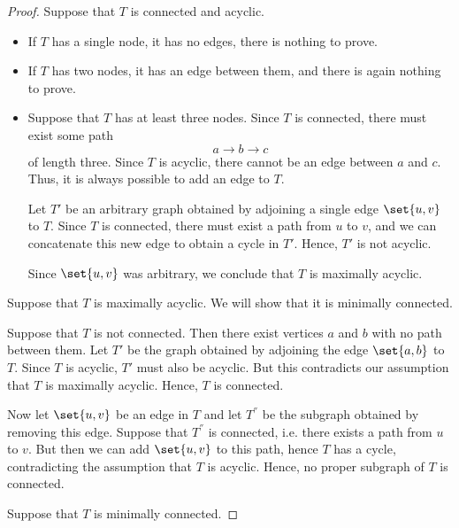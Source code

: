 \begin{proof}
   Suppose that \( T \) is connected and acyclic.

  \begin{itemize}
    \item If \( T \) has a single node, it has no edges, there is nothing to prove.
    \item If \( T \) has two nodes, it has an edge between them, and there is again nothing to prove.
    \item Suppose that \( T \) has at least three nodes. Since \( T \) is connected, there must exist some path
    \begin{equation*}
      a \to b \to c
    \end{equation*}
    of length three. Since \( T \) is acyclic, there cannot be an edge between \( a \) and \( c \). Thus, it is always possible to add an edge to \( T \).

    Let \( T' \) be an arbitrary graph obtained by adjoining a single edge \( \set{ u, v } \) to \( T \). Since \( T \) is connected, there must exist a path from \( u \) to \( v \), and we can concatenate this new edge to obtain a cycle in \( T' \). Hence, \( T' \) is not acyclic.

    Since \( \set{ u, v } \) was arbitrary, we conclude that \( T \) is maximally acyclic.
  \end{itemize}

   Suppose that \( T \) is maximally acyclic. We will show that it is minimally connected.

  Suppose that \( T \) is not connected. Then there exist vertices \( a \) and \( b \) with no path between them. Let \( T' \) be the graph obtained by adjoining the edge \( \set{ a, b } \) to \( T \). Since \( T \) is acyclic, \( T' \) must also be acyclic. But this contradicts our assumption that \( T \) is maximally acyclic. Hence, \( T \) is connected.

  Now let \( \set{ u, v } \) be an edge in \( T \) and let \( T^\dprime \) be the subgraph obtained by removing this edge. Suppose that \( T^\dprime \) is connected, i.e. there exists a path from \( u \) to \( v \). But then we can add \( \set{ u, v } \) to this path, hence \( T \) has a cycle, contradicting the assumption that \( T \) is acyclic. Hence, no proper subgraph of \( T \) is connected.

   Suppose that \( T \) is minimally connected.


\end{proof}
